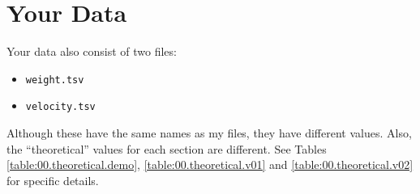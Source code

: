 \section{Your Data}
%
Your data also consist of two files:
\begin{itemize}
    \item \texttt{weight.tsv}
    \item \texttt{velocity.tsv}
\end{itemize}
Although these have the same names as my files, they have different values. Also, the ``theoretical'' values for each section are different. See Tables \ref{table:00.theoretical.demo}, \ref{table:00.theoretical.v01} and \ref{table:00.theoretical.v02} for specific details.
%
